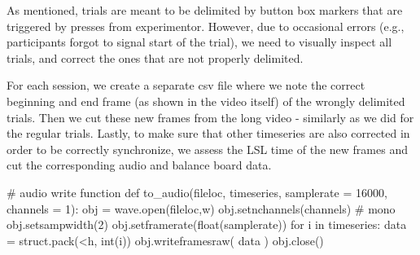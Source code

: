 \documentclass[
  letterpaper,
  DIV=11,
  numbers=noendperiod]{scrreprt}
\newenvironment{Shaded}{\begin{snugshade}}{\end{snugshade}}
\newcommand{\BuiltInTok}[1]{\textcolor[rgb]{0.00,0.23,0.31}{#1}}
\newcommand{\CommentTok}[1]{\textcolor[rgb]{0.37,0.37,0.37}{#1}}
\newcommand{\ControlFlowTok}[1]{\textcolor[rgb]{0.00,0.23,0.31}{#1}}
\newcommand{\DecValTok}[1]{\textcolor[rgb]{0.68,0.00,0.00}{#1}}
\newcommand{\KeywordTok}[1]{\textcolor[rgb]{0.00,0.23,0.31}{#1}}
\newcommand{\NormalTok}[1]{\textcolor[rgb]{0.00,0.23,0.31}{#1}}
\newcommand{\OperatorTok}[1]{\textcolor[rgb]{0.37,0.37,0.37}{#1}}
\newcommand{\StringTok}[1]{\textcolor[rgb]{0.13,0.47,0.30}{#1}}
\begin{document}
As mentioned, trials are meant to be delimited by button box markers
that are triggered by presses from experimentor. However, due to
occasional errors (e.g., participants forgot to signal start of the
trial), we need to visually inspect all trials, and correct the ones
that are not properly delimited.

For each session, we create a separate csv file where we note the
correct beginning and end frame (as shown in the video itself) of the
wrongly delimited trials. Then we cut these new frames from the long
video - similarly as we did for the regular trials. Lastly, to make sure
that other timeseries are also corrected in order to be correctly
synchronize, we assess the LSL time of the new frames and cut the
corresponding audio and balance board data.

\begin{Shaded}
\begin{Highlighting}[]
\CommentTok{\# audio write function}
\KeywordTok{def}\NormalTok{ to\_audio(fileloc, timeseries, samplerate }\OperatorTok{=} \DecValTok{16000}\NormalTok{, channels }\OperatorTok{=} \DecValTok{1}\NormalTok{):}
\NormalTok{    obj }\OperatorTok{=}\NormalTok{ wave.}\BuiltInTok{open}\NormalTok{(fileloc,}\StringTok{\textquotesingle{}w\textquotesingle{}}\NormalTok{)}
\NormalTok{    obj.setnchannels(channels) }\CommentTok{\# mono}
\NormalTok{    obj.setsampwidth(}\DecValTok{2}\NormalTok{)}
\NormalTok{    obj.setframerate(}\BuiltInTok{float}\NormalTok{(samplerate))}
    \ControlFlowTok{for}\NormalTok{ i }\KeywordTok{in}\NormalTok{ timeseries:}
\NormalTok{        data }\OperatorTok{=}\NormalTok{ struct.pack(}\StringTok{\textquotesingle{}\textless{}h\textquotesingle{}}\NormalTok{, }\BuiltInTok{int}\NormalTok{(i))}
\NormalTok{        obj.writeframesraw( data )}
\NormalTok{    obj.close()}


\end{Highlighting}
\end{Shaded}
\end{document}
